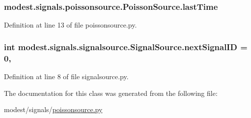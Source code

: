 \subsubsection[{\texorpdfstring{last\+Time}{lastTime}}]{\setlength{\rightskip}{0pt plus 5cm}modest.\+signals.\+poissonsource.\+Poisson\+Source.\+last\+Time\hspace{0.3cm}{\ttfamily [inherited]}}\hypertarget{classmodest_1_1signals_1_1poissonsource_1_1PoissonSource_a34395fc83bd8743a0a5ee69f9392a606}{}\label{classmodest_1_1signals_1_1poissonsource_1_1PoissonSource_a34395fc83bd8743a0a5ee69f9392a606}


Definition at line 13 of file poissonsource.\+py.

\subsubsection[{\texorpdfstring{next\+Signal\+ID}{nextSignalID}}]{\setlength{\rightskip}{0pt plus 5cm}int modest.\+signals.\+signalsource.\+Signal\+Source.\+next\+Signal\+ID = 0\hspace{0.3cm}{\ttfamily [static]}, {\ttfamily [inherited]}}\hypertarget{classmodest_1_1signals_1_1signalsource_1_1SignalSource_a453eafb550b551adbec0903deb63dfce}{}\label{classmodest_1_1signals_1_1signalsource_1_1SignalSource_a453eafb550b551adbec0903deb63dfce}


Definition at line 8 of file signalsource.\+py.



The documentation for this class was generated from the following file\+:\begin{DoxyCompactItemize}
\item 
modest/signals/\hyperlink{poissonsource_8py}{poissonsource.\+py}\end{DoxyCompactItemize}
